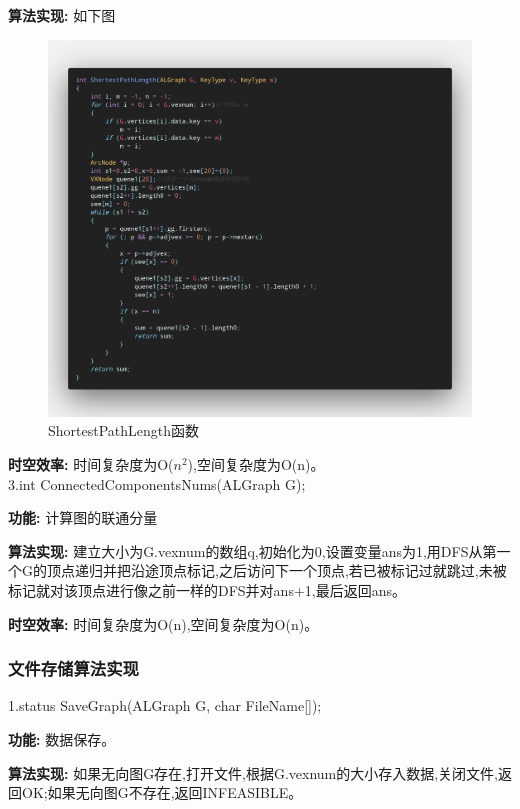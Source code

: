 \documentclass[supercite]{Experimental_Report}
\theoremstyle{definition}
\begin{document}
\textbf{算法实现: }如下图

\begin{figure}[htb]
	\begin{center}
		\includegraphics[scale=0.20]{images/2-1.png}
		\caption{ShortestPathLength函数}
		\label{fig2-1}
	\end{center}
\end{figure}

\textbf{时空效率: }时间复杂度为O($n^{2}$),空间复杂度为O(n)。\\

3.int ConnectedComponentsNums(ALGraph G);

\textbf{功能: }计算图的联通分量

\textbf{算法实现: }建立大小为G.vexnum的数组q,初始化为0,设置变量ans为1,用DFS从第一个G的顶点递归并把沿途顶点标记,之后访问下一个顶点,若已被标记过就跳过,未被标记就对该顶点进行像之前一样的DFS并对ans+1,最后返回ans。

\textbf{时空效率: }时间复杂度为O(n),空间复杂度为O(n)。\\

\subsubsection{文件存储算法实现}

1.status SaveGraph(ALGraph G, char FileName[]);

\textbf{功能: }数据保存。

\textbf{算法实现: }如果无向图G存在,打开文件,根据G.vexnum的大小存入数据,关闭文件,返回OK;如果无向图G不存在,返回INFEASIBLE。
\end{document}
